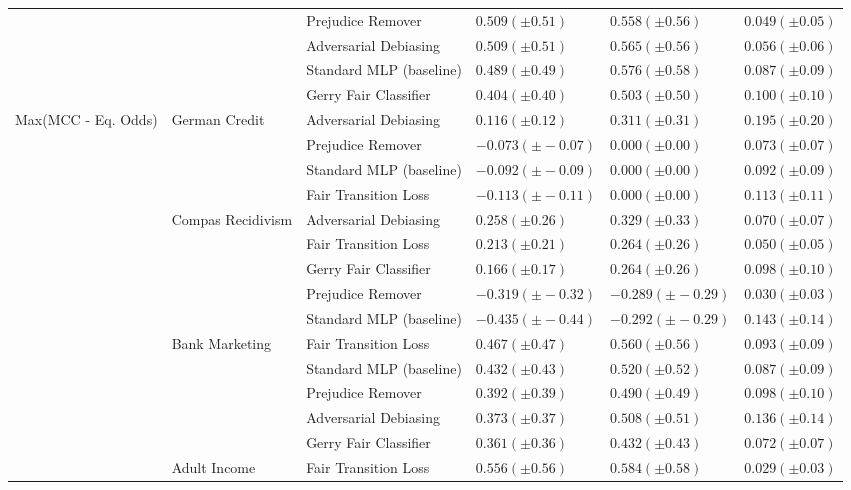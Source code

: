 \begin{tabular}{llllll}
 &  & Prejudice Remover & $0.509 (\pm0.51)$ & $0.558 (\pm0.56)$ & $0.049 (\pm0.05)$ \\
 &  & Adversarial Debiasing & $0.509 (\pm0.51)$ & $0.565 (\pm0.56)$ & $0.056 (\pm0.06)$ \\
 &  & Standard MLP (baseline) & $0.489 (\pm0.49)$ & $0.576 (\pm0.58)$ & $0.087 (\pm0.09)$ \\
 &  & Gerry Fair Classifier & $0.404 (\pm0.40)$ & $0.503 (\pm0.50)$ & $0.100 (\pm0.10)$ \\
\cline{1-6} \cline{2-6}
\multirow[t]{19}{*}{Max(MCC - Eq. Odds)} & \multirow[t]{4}{*}{German Credit} & Adversarial Debiasing & $0.116 (\pm0.12)$ & $0.311 (\pm0.31)$ & $0.195 (\pm0.20)$ \\
 &  & Prejudice Remover & $-0.073 (\pm-0.07)$ & $0.000 (\pm0.00)$ & $0.073 (\pm0.07)$ \\
 &  & Standard MLP (baseline) & $-0.092 (\pm-0.09)$ & $0.000 (\pm0.00)$ & $0.092 (\pm0.09)$ \\
 &  & Fair Transition Loss & $-0.113 (\pm-0.11)$ & $0.000 (\pm0.00)$ & $0.113 (\pm0.11)$ \\
\cline{2-6}
 & \multirow[t]{5}{*}{Compas Recidivism} & Adversarial Debiasing & $0.258 (\pm0.26)$ & $0.329 (\pm0.33)$ & $0.070 (\pm0.07)$ \\
 &  & Fair Transition Loss & $0.213 (\pm0.21)$ & $0.264 (\pm0.26)$ & $0.050 (\pm0.05)$ \\
 &  & Gerry Fair Classifier & $0.166 (\pm0.17)$ & $0.264 (\pm0.26)$ & $0.098 (\pm0.10)$ \\
 &  & Prejudice Remover & $-0.319 (\pm-0.32)$ & $-0.289 (\pm-0.29)$ & $0.030 (\pm0.03)$ \\
 &  & Standard MLP (baseline) & $-0.435 (\pm-0.44)$ & $-0.292 (\pm-0.29)$ & $0.143 (\pm0.14)$ \\
\cline{2-6}
 & \multirow[t]{5}{*}{Bank Marketing} & Fair Transition Loss & $0.467 (\pm0.47)$ & $0.560 (\pm0.56)$ & $0.093 (\pm0.09)$ \\
 &  & Standard MLP (baseline) & $0.432 (\pm0.43)$ & $0.520 (\pm0.52)$ & $0.087 (\pm0.09)$ \\
 &  & Prejudice Remover & $0.392 (\pm0.39)$ & $0.490 (\pm0.49)$ & $0.098 (\pm0.10)$ \\
 &  & Adversarial Debiasing & $0.373 (\pm0.37)$ & $0.508 (\pm0.51)$ & $0.136 (\pm0.14)$ \\
 &  & Gerry Fair Classifier & $0.361 (\pm0.36)$ & $0.432 (\pm0.43)$ & $0.072 (\pm0.07)$ \\
\cline{2-6}
 & \multirow[t]{5}{*}{Adult Income} & Fair Transition Loss & $0.556 (\pm0.56)$ & $0.584 (\pm0.58)$ & $0.029 (\pm0.03)$ \\

\end{tabular}
